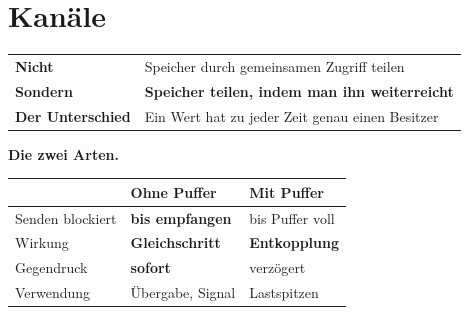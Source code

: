 \chapter{Kanäle}\label{kap:kanaele}

\begin{merksatz}
\begin{center}
\renewcommand{\arraystretch}{1.55}
\begin{tabular}{@{}P{2.6cm}P{6.2cm}@{}}
\toprule
\textbf{Nicht} & Speicher durch gemeinsamen Zugriff teilen\\
\textbf{Sondern} & \textbf{Speicher teilen, indem man ihn weiterreicht}\\
\textbf{Der Unterschied} & Ein Wert hat zu jeder Zeit genau einen Besitzer\\
\bottomrule
\end{tabular}
\end{center}

\begin{center}
\begin{minipage}{0.88\textwidth}
\end{minipage}
\end{center}

\textbf{Die zwei Arten.}

\begin{center}
\renewcommand{\arraystretch}{1.5}
\begin{tabular}{@{}P{2.4cm}P{2.8cm}P{3.0cm}@{}}
\toprule
& \textbf{Ohne Puffer} & \textbf{Mit Puffer}\\
\midrule
Senden blockiert & \textbf{bis empfangen} & bis Puffer voll\\
Wirkung & \textbf{Gleichschritt} & \textbf{Entkopplung}\\
Gegendruck & \textcolor{gruen}{\textbf{sofort}} & \textcolor{mittel}{verzögert}\\
Verwendung & Übergabe, Signal & \textcolor{gruen}{Lastspitzen}\\
\bottomrule
\end{tabular}
\end{center}

\begin{center}
\end{center}


\end{merksatz}
